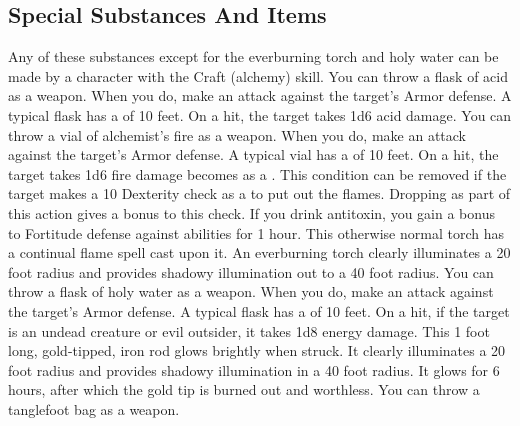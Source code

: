     \subsection{Special Substances And Items}
        Any of these substances except for the everburning torch and holy water can be made by a character with the Craft (alchemy) skill.
         You can throw a flask of acid as a weapon.
        When you do, make an attack against the target's Armor defense.
        A typical flask has a  of 10 feet.
        On a hit, the target takes 1d6 acid damage.
         You can throw a vial of alchemist's fire as a weapon.
        When you do, make an attack against the target's Armor defense.
        A typical vial has a  of 10 feet.
        On a hit, the target takes 1d6 fire damage becomes  as a .
        This condition can be removed if the target makes a  10 Dexterity check as a  to put out the flames.
        Dropping  as part of this action gives a  bonus to this check.
         If you drink antitoxin, you gain a  bonus to Fortitude defense against  abilities for 1 hour.
         This otherwise normal torch has a continual flame spell cast upon it. An everburning torch clearly illuminates a 20 foot radius and provides shadowy illumination out to a 40 foot radius.
         You can throw a flask of holy water as a weapon.
        When you do, make an attack against the target's Armor defense.
        A typical flask has a  of 10 feet.
        On a hit, if the target is an undead creature or evil outsider, it takes 1d8 energy damage.
         This 1 foot long, gold-tipped, iron rod glows brightly when struck. It clearly illuminates a 20 foot radius and provides shadowy illumination in a 40 foot radius. It glows for 6 hours, after which the gold tip is burned out and worthless.
         You can throw a tanglefoot bag as a weapon.
